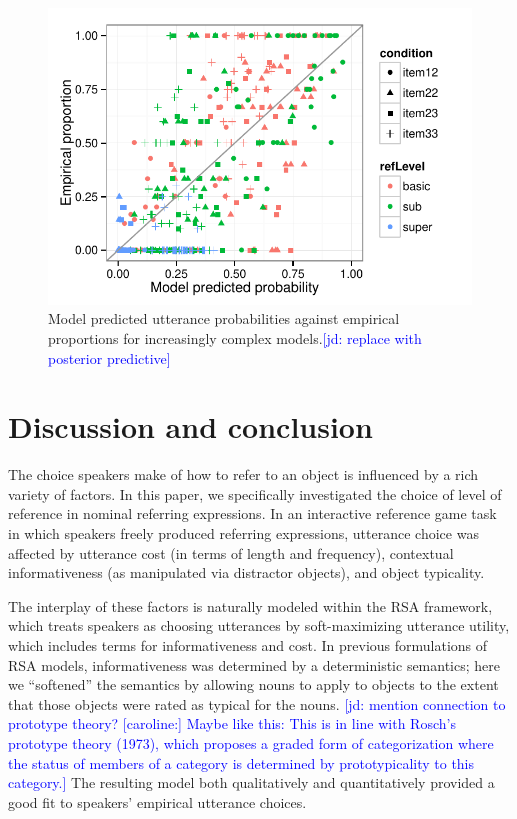 \documentclass[10pt,letterpaper]{article}
\newcommand{\jd}[1]{\textcolor{Blue}{[jd: #1]}}
\newcommand{\ndg}[1]{\textcolor{Green}{[ndg: #1]}}
\begin{document}
\begin{figure}[ht!]
\centering
\includegraphics[width=.5\textwidth]{graphs/scatterplot}
\caption{Model predicted utterance probabilities against empirical proportions for increasingly complex models.\jd{replace with posterior predictive}}
 \label{fig:scatterplot}
\end{figure}

\section{\bf Discussion and conclusion}


The choice speakers make of how to refer to an object is influenced by a rich variety of factors.
In this paper, we specifically investigated the choice of level of reference in nominal referring expressions. In an interactive reference game task in which speakers freely produced referring expressions, utterance choice was affected by utterance cost (in terms of length and frequency), contextual informativeness (as manipulated via distractor objects), and object typicality.

The interplay of these factors is naturally modeled within the RSA framework, which treats speakers as choosing utterances by soft-maximizing utterance utility, which includes terms for informativeness and cost. In previous formulations of RSA models, informativeness was determined by a deterministic semantics; here we ``softened'' the semantics by allowing nouns to apply to objects to the extent that those objects were rated as typical for the nouns. \jd{mention connection to prototype theory? [caroline:] Maybe like this: This is in line with Rosch's prototype theory (1973), which proposes a graded form of categorization where the status of members of a category is determined by prototypicality to this category.} 
 The resulting model both qualitatively and quantitatively provided a good fit to speakers' empirical utterance choices. 
\end{document}
